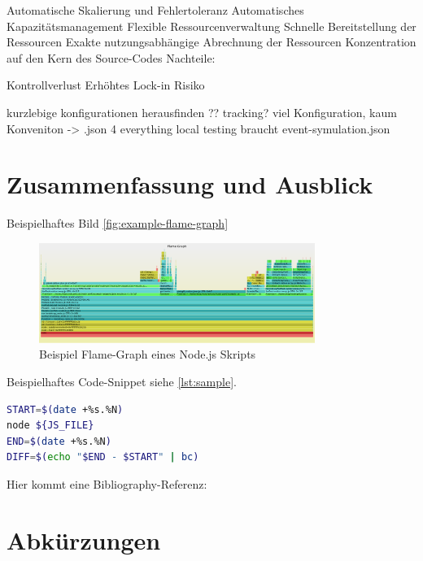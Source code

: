 \documentclass[
12pt,
english,
ngerman,
headsepline,
twoside,
openright,
numbers=noenddot,version=first
]{scrreprt}
\begin{document}
Automatische Skalierung und Fehlertoleranz
Automatisches Kapazitätsmanagement
Flexible Ressourcenverwaltung
Schnelle Bereitstellung der Ressourcen
Exakte nutzungsabhängige Abrechnung der Ressourcen
Konzentration auf den Kern des Source-Codes
Nachteile:

Kontrollverlust
Erhöhtes Lock-in Risiko

kurzlebige konfigurationen herausfinden ?? tracking?
viel Konfiguration, kaum Konveniton -> .json 4 everything
local testing braucht event-symulation.json

\chapter{Zusammenfassung und Ausblick}


Beispielhaftes Bild \autoref{fig:example-flame-graph}

\begin{figure}[h]
	\centering
	\includegraphics[width=0.8\textwidth]{pics/example-flame-graph.eps}
	\caption{Beispiel Flame-Graph eines Node.js Skripts}
	\label{fig:example-flame-graph}
\end{figure}

Beispielhaftes Code-Snippet siehe \autoref{lst:sample}.

\begin{lstlisting}[language=bash,caption={Aufnahme der \glqq real\grqq-Zeit},label={lst:sample}]
START=$(date +%s.%N)
node ${JS_FILE}
END=$(date +%s.%N)
DIFF=$(echo "$END - $START" | bc)
\end{lstlisting}

Hier kommt eine Bibliography-Referenz: \cite{booch2007object}

\lstlistoflistings

\listoffigures

\listoftables

\chapter*{Abkürzungen}

\end{document}
